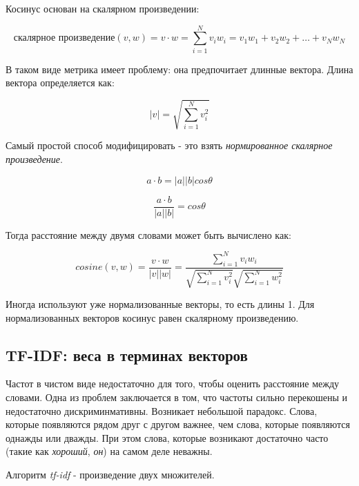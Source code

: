 \documentclass[a4paper,12pt,preview]{report} %
\begin{document}
	Косинус основан на скалярном произведении:
	
	\begin{equation}
	\textit{скалярное произведение} (v, w) = v \cdot w = \sum_{i=1}^{N}v_i w_i = v_1 w_1 + v_2 w_2 + \dots + v_N w_N
	\end{equation}
	
	В таком виде метрика имеет проблему: она предпочитает длинные вектора. Длина вектора определяется как:
	
	\begin{equation}
	|v| = \sqrt{\sum_{i=1}^N v_i^2}
	\end{equation}
	
	Самый простой способ модифицировать - это взять \textit{нормированное скалярное произведение}. 
	
	\begin{equation}
	a \cdot b = |a| |b| cos \theta
	\end{equation}
	
	\begin{equation}
	\dfrac{a \cdot b}{|a| |b|} = cos \theta
	\end{equation}
	
	Тогда расстояние между двумя словами может быть вычислено как:
	
	\begin{equation}
	cosine(v, w) = \dfrac{v \cdot w}{|v| |w|} = \dfrac{\sum_{i=1}^N v_i w_i}{\sqrt{\sum_{i=1}^N v_i^2}\sqrt{\sum_{i=1}^N w_i^2}}
	\end{equation}
	
	Иногда используют уже нормализованные векторы, то есть длины 1. Для нормализованных векторов косинус равен скалярному произведению.
	
	
	\subsection{TF-IDF: веса в терминах векторов}
	
	Частот в чистом виде недостаточно для того, чтобы оценить расстояние между словами. Одна из проблем заключается в том, что частоты сильно перекошены и недостаточно дискриминмативны. Возникает небольшой парадокс. Слова, которые появляются рядом друг с другом важнее, чем слова, которые появляются однажды или дважды. При этом слова, которые возникают достаточно часто (такие как \textit{хороший}, \textit{он}) на самом деле неважны. 
	
	Алгоритм \textit{tf-idf} - произведение двух множителей. 
	
\end{document}
